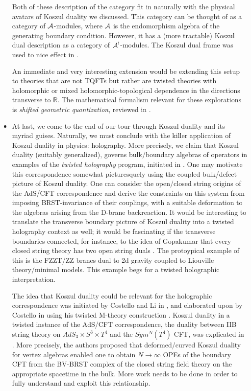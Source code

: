 \documentclass[11pt]{amsart}
\begin{document}
\begin{itemize}
Both of these description of the category fit in naturally with the physical avatars of Koszul duality we discussed. This category can be thought of as a category of $\mathcal A$-modules, where $\mathcal A$ is the endomorphism algebra of the generating boundary condition. However, it has a (more tractable) Koszul dual description as a category of $\mathcal A^{!}$-modules. The Koszul dual frame was used to nice effect in \cite{EY}. 


An immediate and very interesting extension would be extending this setup to theories that are not TQFTs but rather are twisted theories with holomorphic or mixed holomorphic-topological dependence in the directions transverse to $\mathbb{R}$. The mathematical formalism relevant for these explorations is \textit{shifted geometric quantization}, reviewed in \cite{Safronov}. \\



\item At last, we come to the end of our tour through Koszul duality and its myriad guises. Naturally, we must conclude with the killer application of Koszul duality in physics: holography. More precisely, we claim that Koszul duality (suitably generalized), governs bulk/boundary algebras of operators in examples of the \textit{twisted holography} program, initiated in \cite{CG}. One may motivate this correspondence somewhat picturesquely using the coupled bulk/defect picture of Koszul duality. One can consider the open/closed string origins of the AdS/CFT correspondence and derive the constraints on this system from imposing BRST-invariance of their couplings, with a suitable deformation to the algebras arising from the D-brane backreaction. It would be interesting to translate the transverse boundary picture of Koszul duality into a twisted holography context as well; it would be fascinating if the transverse boundaries connected, for instance, to the idea of Gopakumar that every closed string theory has two open string duals \cite{Gopakumar}. The protoypical example of this is the FZZT/ZZ branes dual to 2d gravity coupled to Liouville theory/minimal models. This example begs for a twisted holographic interpretation. 

The idea that Koszul duality could be relevant for the holographic correspondence was initiated by Costello and Li in \cite{TwistedSugra}, and elaborated upon by Costello in \cite{CostelloM2} using his twisted M-theory construction \cite{CostelloMtheory}. Koszul duality in a twisted instance of the AdS/CFT correspondence, the duality between IIB string theory on $AdS_3 \times S^3 \times T^4$ and the $Sym^N(T^4)$ CFT, was explicated in \cite{CP}. More precisely, the authors proposed that deformed/curved Koszul duality for vertex algebras enabled one to obtain $N \rightarrow \infty$ OPEs of the boundary CFT from the BV-BRST complex of the closed string field theory on the appropriate spacetime in the bulk. More work needs to be done in order to fully understand and exploit this relationship. 


\end{itemize}
\end{document}

